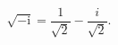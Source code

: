 \documentclass[fleqn,12pt]{exam}
\newcommand{\complex}{\mathbf{C}}
\newcommand{\imag}{\mathrm{i}}
\newcommand{\range}{\mathrm{range}}
\newcommand{\reals}{\mathbf{R}}
\begin{document}
\begin{questions}
\begin{parts}
 \part  \(\sqrt{-\imag}\)
\end{parts}


\begin{solution}
\[
   \sqrt{-\imag} = \frac{1}{\sqrt{2}}-\frac{i}{\sqrt{2}}.
\] 
\end{solution}











\end{questions}
\end{document}
